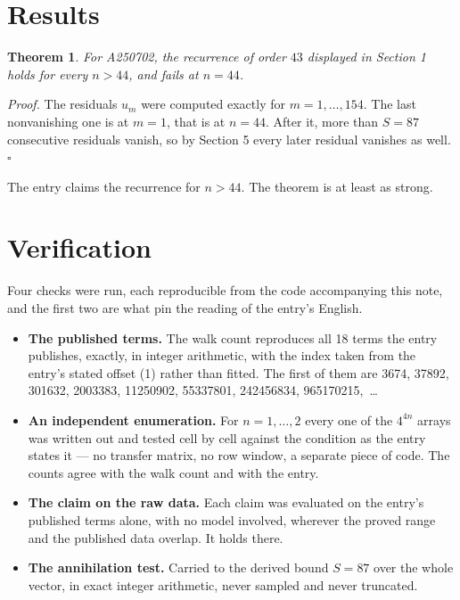 \documentclass[11pt]{article}
\newtheorem{theorem}{Theorem}
\theoremstyle{definition}
\begin{document}
\section{Results}

\begin{theorem} For A250702, the recurrence of order $43$ displayed in Section 1 holds for every $n > 44$, and fails at $n = 44$.\end{theorem}

{\itshape Proof.} The residuals $u_m$ were computed exactly for $m = 1,\dots,154$. The last nonvanishing one is at $m = 1$, that is at $n = 44$. After it, more than $S = 87$ consecutive residuals vanish, so by Section 5 every later residual vanishes as well. $\square$

The entry claims the recurrence for $n > 44$. The theorem is at least as strong.

\section{Verification}

Four checks were run, each reproducible from the code accompanying this note, and the first two are what pin the reading of the entry's English.

\begin{itemize}

\item {\bfseries The published terms.} The walk count reproduces all 18 terms the entry publishes, exactly, in integer arithmetic, with the index taken from the entry's stated offset (1) rather than fitted. The first of them are 3674, 37892, 301632, 2003383, 11250902, 55337801, 242456834, 965170215,~\dots

\item {\bfseries An independent enumeration.} For $n = 1,\dots,2$ every one of the $4^{4n}$ arrays was written out and tested cell by cell against the condition as the entry states it --- no transfer matrix, no row window, a separate piece of code. The counts agree with the walk count and with the entry.

\item {\bfseries The claim on the raw data.} Each claim was evaluated on the entry's published terms alone, with no model involved, wherever the proved range and the published data overlap. It holds there.

\item {\bfseries The annihilation test.} Carried to the derived bound $S = 87$ over the whole vector, in exact integer arithmetic, never sampled and never truncated.

\end{itemize}
\end{document}

